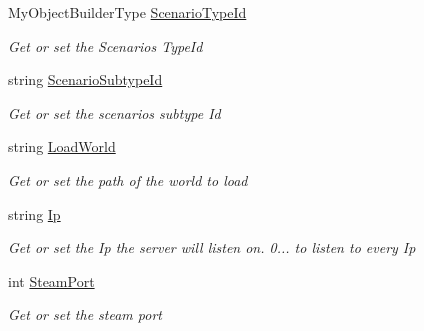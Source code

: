 \begin{DoxyCompactItemize}
\item 
My\+Object\+Builder\+Type \hyperlink{class_s_e_mod_a_p_i_1_1_a_p_i_1_1_definitions_1_1_dedicated_config_definition_a95ceb38feeb4aa766e2fa0a08f86eeda}{Scenario\+Type\+Id}
\begin{DoxyCompactList}\small\item\em Get or set the Scenario\textquotesingle{}s Type\+Id \end{DoxyCompactList}\item 
string \hyperlink{class_s_e_mod_a_p_i_1_1_a_p_i_1_1_definitions_1_1_dedicated_config_definition_aa788b6c18133aec451277673d961444a}{Scenario\+Subtype\+Id}
\begin{DoxyCompactList}\small\item\em Get or set the scenario\textquotesingle{}s subtype Id \end{DoxyCompactList}\item 
string \hyperlink{class_s_e_mod_a_p_i_1_1_a_p_i_1_1_definitions_1_1_dedicated_config_definition_a4a512c008a443ae8d34f990060ee90e3}{Load\+World}
\begin{DoxyCompactList}\small\item\em Get or set the path of the world to load \end{DoxyCompactList}\item 
string \hyperlink{class_s_e_mod_a_p_i_1_1_a_p_i_1_1_definitions_1_1_dedicated_config_definition_a0f11205029e4e90455d972b6e78ee7e2}{Ip}
\begin{DoxyCompactList}\small\item\em Get or set the Ip the server will listen on. 0... to listen to every Ip \end{DoxyCompactList}\item 
int \hyperlink{class_s_e_mod_a_p_i_1_1_a_p_i_1_1_definitions_1_1_dedicated_config_definition_ab86d56ab29de6e34641e6a455ebc2b29}{Steam\+Port}
\begin{DoxyCompactList}\small\item\em Get or set the steam port \end{DoxyCompactList}\item 

\end{DoxyCompactItemize}
